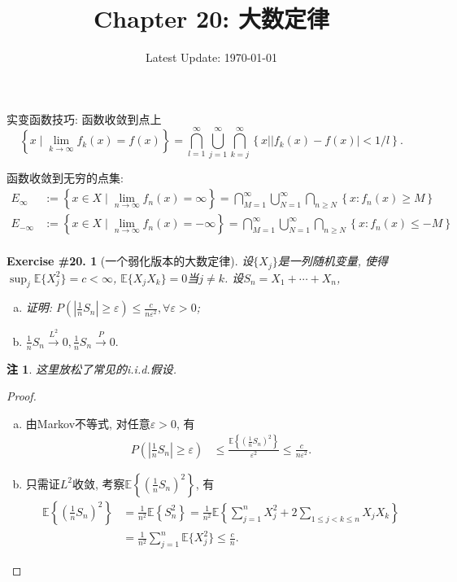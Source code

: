 \documentclass[UTF8, a4paper]{article}
\title{Chapter 20: 大数定律}
\author{}
\date{Latest Update: \today}
\newtheorem{exercise}{Exercise \#20.}
\newtheorem*{remark}{注}
\begin{document}
\maketitle

实变函数技巧: 函数收敛到点上
$$
\left\{x \mid \lim _{k \rightarrow \infty} f_k(x)=f(x)\right\}=\bigcap_{l=1}^{\infty} \bigcup_{j=1}^{\infty} \bigcap_{k=j}^{\infty}\left\{x| | f_k(x)-f(x) \mid<1 / l\right\} .
$$

函数收敛到无穷的点集:
$$
\begin{aligned}
    E_{\infty}&:= \left\{x \in X \mid \lim _{n \rightarrow \infty} f_n(x)=  \infty\right\}=\bigcap_{M=1}^{\infty} \bigcup_{N=1}^{\infty} \bigcap_{n \geq N}\left\{x: f_n(x) \geq M\right\}\\
    E_{-\infty}&:= \left\{x \in X \mid \lim _{n \rightarrow \infty} f_n(x)=  -\infty\right\}=\bigcap_{M=1}^{\infty} \bigcup_{N=1}^{\infty} \bigcap_{n \geq N}\left\{x: f_n(x) \leq -M\right\}\\
\end{aligned}
$$


\begin{framed}
\begin{exercise}[一个弱化版本的大数定律]
设\(\{X_j\}\)是一列随机变量, 使得\(\sup_j \mathbb{E}\{X_j^2\} = c < \infty\), \(\mathbb{E}\{X_j X_k\} = 0\)当\(j \neq k\).
设\(S_n = X_1 + \cdots + X_n\),  
\begin{enumerate}[a)]
    \item 证明: \(P\left(\left|\frac{1}{n}S_n\right| \geq \varepsilon\right) \leq \frac{c}{n\varepsilon^2}, \forall \varepsilon > 0\);
    \item \(\frac{1}{n}S_n \xrightarrow{L^2} 0, \frac{1}{n}S_n \xrightarrow{P} 0.\)
\end{enumerate}
\end{exercise}
\end{framed}
\begin{remark}
这里放松了常见的i.i.d.假设.
\end{remark}


\begin{proof}
\begin{enumerate}[a)]
\item 
由Markov不等式, 对任意\(\varepsilon > 0\), 有
\begin{align*}
    P\left(\left|\frac{1}{n}S_n\right| \geq \varepsilon\right) & \leq \frac{\mathbb{E}\left\{\left(\frac{1}{n}S_n\right)^2\right\}}{\varepsilon^2} \leq \frac{c}{n\varepsilon^2}.
\end{align*}
\item 只需证\(L^2\)收敛, 考察\(\mathbb{E}\left\{\left(\frac{1}{n}S_n\right)^2\right\}\), 有
\begin{align*}
    \mathbb{E}\left\{\left(\frac{1}{n}S_n\right)^2\right\} &= \frac{1}{n^2}\mathbb{E}\left\{S_n^2\right\} = \frac{1}{n^2}\mathbb{E}\left\{\sum_{j=1}^{n}X_j^2 + 2\sum_{1\leq j < k \leq n}X_jX_k\right\} \\
    &= \frac{1}{n^2}\sum_{j=1}^{n}\mathbb{E}\{X_j^2\} \leq \frac{c}{n}.
\end{align*}
\end{enumerate}
\end{proof}
\end{document}
